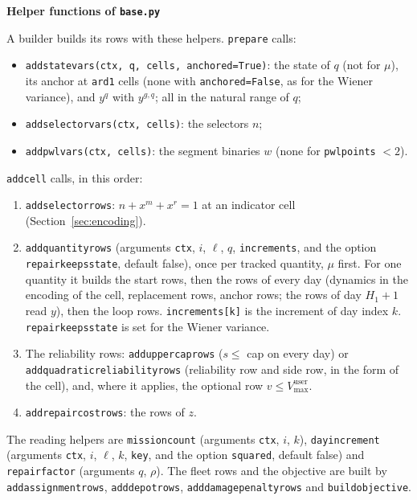 \documentclass[11pt,a4paper]{article}
\theoremstyle{plain}
\theoremstyle{definition}
\newcommand{\blockhead}[1]{\par\noindent\textbf{#1}\par\nobreak}
\renewcommand{\_}{\textunderscore\allowbreak{}}
\begin{document}
\blockhead{Helper functions of \texttt{base.py}}
A builder builds its rows with these helpers. \texttt{prepare} calls:
\begin{itemize}[nosep,leftmargin=1.5em]
  \item \texttt{add\_state\_vars(ctx, q, cells, anchored=True)}: the state of $q$ (not for $\mu$), its anchor at \texttt{ard1} cells (none with \texttt{anchored=False}, as for the Wiener variance), and $y^q$ with $y^{g,q}$; all in the natural range of $q$;
  \item \texttt{add\_selector\_vars(ctx, cells)}: the selectors $n$;
  \item \texttt{add\_pwl\_vars(ctx, cells)}: the segment binaries $w$ (none for \texttt{pwl\_points} $< 2$).
\end{itemize}
\texttt{add\_cell} calls, in this order:
\begin{enumerate}[nosep,label=\arabic*.]
  \item \texttt{add\_selector\_rows}: $n + x^m + x^r = 1$ at an indicator cell (Section~\ref{sec:encoding}).
  \item \texttt{add\_quantity\_rows} (arguments \texttt{ctx}, $i$, $\ell$, $q$, \texttt{increments}, and the option \texttt{repair\_keeps\_state}, default false), once per tracked quantity, $\mu$ first. For one quantity it builds the start rows, then the rows of every day (dynamics in the encoding of the cell, replacement rows, anchor rows; the rows of day $H_1 + 1$ read $y$), then the loop rows. \texttt{increments[k]} is the increment of day index $k$. \texttt{repair\_keeps\_state} is set for the Wiener variance.
  \item The reliability rows: \texttt{add\_upper\_cap\_rows} ($s \le$ cap on every day) or \texttt{add\_quadratic\_reliability\_rows} (reliability row and side row, in the form of the cell), and, where it applies, the optional row $v \le V^{\mathrm{user}}_{\max}$.
  \item \texttt{add\_repair\_cost\_rows}: the rows of $z$.
\end{enumerate}
The reading helpers are \texttt{mission\_count} (arguments \texttt{ctx}, $i$, $k$), \texttt{day\_increment} (arguments \texttt{ctx}, $i$, $\ell$, $k$, \texttt{key}, and the option \texttt{squared}, default false) and \texttt{repair\_factor} (arguments $q$, $\rho$). The fleet rows and the objective are built by \texttt{add\_assignment\_rows}, \texttt{add\_depot\_rows}, \texttt{add\_damage\_penalty\_rows} and \texttt{build\_objective}.
\end{document}
